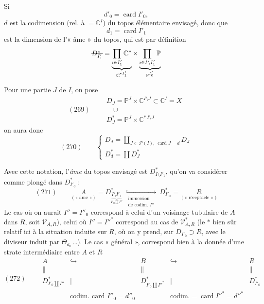 \documentclass[11pt,a4paper]{article}
\begin{document}
Si
\[ d'_0=\operatorname{card} I'_0, \]
$d$ est la codimension (rel. à   $=\mathbb{C}^I$) du topos élémentaire envisagé,   donc que
\[ d_1=\operatorname{card} I'_1 \]
est la dimension de l'« âme » du topos, qui est par définition
\[ \text{\struck{$D^*_{I'_1}$}}=\underbrace{\prod_{i\in I'_1}\mathbb{C}^*}_{\mathbb{C}^{*I'_1}}\times\underbrace{\prod_{i\in I\setminus I'_1}\mathbb{P}}_{\mathbb{P}^{I'_0}} \]

  

Pour une partie $J$ de $I$, on pose
\[ (269)\qquad \begin{array}{l} D_J=\mathbb{P}^J\times\mathbb{C}^{I\setminus J}\subset\mathbb{C}^I=X\\ \quad\cup\\ D^*_J=\mathbb{P}^J\times\mathbb{C}^{*\,I\setminus J} \end{array} \]
on aura donc
\[ (270)\qquad \left\{\begin{array}{l} D_d=\coprod_{J\subset\mathcal{P}(I),\ \operatorname{card}J=d} D_J\\ D^*_d=\coprod D^*_J \end{array}\right. \]

Avec cette notation, l'\emph{âme} du topos  envisagé est $D^*_{I\setminus I'_1}$, qu'on va considérer comme plongé dans $D^*_{I'_0}$\,:
\[ (271)\qquad \underset{(\text{« âme »})}{A}=D^*_{\underbrace{\scriptstyle I\setminus I'_1}_{I'_0\amalg I''}}\ \underset{\substack{\text{immersion}\\ \text{de codim. } I''}}{\hookrightarrow}\ D^*_{I'_0}=\underset{(\text{« réceptacle »})}{R} \]
Le  cas où on aurait $I''=I''_0$ correspond à celui d'un voisinage tubulaire de  $A$ dans $R$, soit $\mathcal{V}_{A,R}$), celui où $I''=I''^*$ correspond au cas de $\mathcal{V}^*_{A,R}$ (le $*$ bien sûr relatif ici à la situation induite sur $R$, où on y prend, sur $D_{I'_0}\supset R$, avec le diviseur induit par $\Theta_{d_0}$\,…). Le cas « général », correspond bien  à la donnée d'une strate intermédiaire entre $A$ et $R$
\[ (272)\qquad \begin{array}{ccccc} A & \hookrightarrow & B & \hookrightarrow & R\\ \| & & \| & & \|\\ D^*_{I'_0\amalg I''} & \big| & D^*_{I'_0\amalg I''^*} & \big| & D^*_{I'_0}\\ & \scriptstyle\text{codim. card } I''_0=d''_0 & & \scriptstyle\text{codim.}=\operatorname{card}I''^*=d''^* & \end{array} \]
\end{document}
